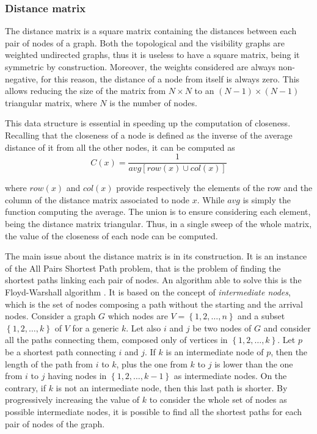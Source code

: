 \subsubsection{Distance matrix}

The distance matrix is a square matrix containing the distances between
each pair of nodes of a graph. Both the topological and the visibility
graphs are weighted undirected graphs, thus it is useless to have
a square matrix, being it symmetric by construction. Moreover, the
weights considered are always non-negative, for this reason, the distance
of a node from itself is always zero. This allows reducing the size
of the matrix from $N\times N$ to an $\left(N-1\right)\times\left(N-1\right)$
triangular matrix, where $N$ is the number of nodes. 

This data structure is essential in speeding up the computation of
closeness. Recalling that the closeness of a node is defined as the
inverse of the average distance of it from all the other nodes, it
can be computed as
\[
C\left(x\right)=\frac{1}{avg\left[row\left(x\right)\cup col\left(x\right)\right]}
\]

where $row\left(x\right)$ and $col\left(x\right)$ provide respectively
the elements of the row and the column of the distance matrix associated
to node $x$. While $avg$ is simply the function computing the average.
The union is to ensure considering each element, being the distance
matrix triangular. Thus, in a single sweep of the whole matrix, the
value of the closeness of each node can be computed. 

The main issue about the distance matrix is in its construction. It
is an instance of the All Pairs Shortest Path problem, that is the
problem of finding the shortest paths linking each pair of nodes.
An algorithm able to solve this is the Floyd-Warshall algorithm \cite{Cormen2010}. 
It is based on the concept of \emph{intermediate nodes}, which is the
set of nodes composing a path without the starting and the arrival
nodes. Consider a graph $G$ which nodes are $V=\left\{ 1,2,\ldots,n\right\} $
and a subset $\left\{ 1,2,\ldots,k\right\} $ of $V$ for a generic
$k$. Let also $i$ and $j$ be two nodes of $G$ and consider all
the paths connecting them, composed only of vertices in $\left\{ 1,2,\ldots,k\right\} $.
Let $p$ be a shortest path connecting $i$ and $j$. If $k$ is an
intermediate node of $p$, then the length of the path from $i$ to
$k$, plus the one from $k$ to $j$ is lower than the one from $i$
to $j$ having nodes in $\left\{ 1,2,\ldots,k-1\right\} $ as intermediate
nodes. On the contrary, if $k$ is not an intermediate node, then
this last path is shorter. By progressively increasing the value of
$k$ to consider the whole set of nodes as possible intermediate nodes,
it is possible to find all the shortest paths for each pair of nodes
of the graph.


